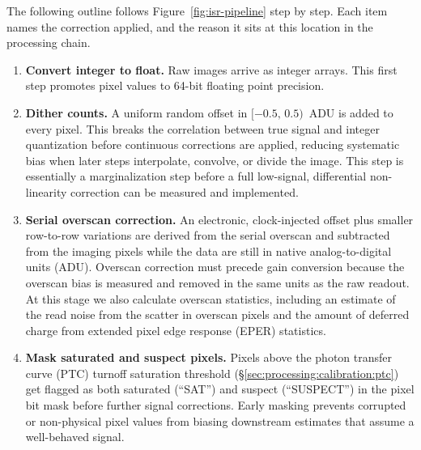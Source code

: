 The following outline follows Figure~\ref{fig:isr-pipeline} step by step.
Each item names the correction applied, and the reason it sits at this location in the processing chain.

\begin{enumerate}
    \item \textbf{Convert integer to float.}
    Raw images arrive as integer arrays. This first step promotes pixel values to 64-bit floating point precision.

    \item \textbf{Dither counts.}
    A uniform random offset in $[-0.5,\,0.5)$~ADU is added to every pixel.
    This breaks the correlation between true signal and integer quantization before continuous corrections are applied, reducing systematic bias when later steps interpolate, convolve, or divide the image.
    This step is essentially a marginalization step before a full low-signal, differential non-linearity correction can be measured and implemented.

    \item \textbf{Serial overscan correction.}
    An electronic, clock-injected offset plus smaller row-to-row variations are derived from the serial overscan and subtracted from the imaging pixels while the data are still in native analog-to-digital units (ADU).
    Overscan correction must precede gain conversion because the overscan bias is measured and removed in the same units as the raw readout. 
    At this stage we also calculate overscan statistics, including an estimate of the read noise from the scatter in overscan pixels and the amount of deferred charge from extended pixel edge response (EPER) statistics.

    \item \textbf{Mask saturated and suspect pixels.}
    Pixels above the photon transfer curve (PTC) turnoff saturation threshold (\S\ref{sec:processing:calibration:ptc}) get flagged as both saturated (``SAT'') and suspect (``SUSPECT'') in the pixel bit mask before further signal corrections.
    Early masking prevents corrupted or non-physical pixel values from biasing downstream estimates that assume a well-behaved signal.


\end{enumerate}
